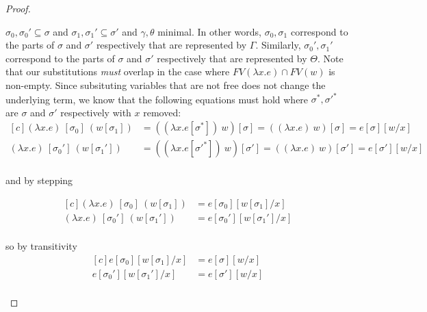 \begin{proof}
\begin{description}
      $\sigma_0, \sigma_0' \subseteq \sigma$ and 
      $\sigma_1, \sigma_1' \subseteq \sigma'$ and $\gamma, \theta$ minimal.
      In other words, $\sigma_0, \sigma_1$ correspond to the parts of $\sigma$ and $\sigma'$ 
      respectively that are represented by $\Gamma$.
      Similarly, $\sigma_0', \sigma_1'$ correspond to the parts of $\sigma$ and $\sigma'$ 
      respectively that are represented by $\Theta$.
      Note that our substitutions \textit{must} overlap in the case where $FV(\lambda x . e)
      \cap FV(w)$ is non-empty.
      Since subsituting variables that are not free does not change the
      underlying term, we know that the following equations must hold where
      $\sigma^*, \sigma'^*$ are $\sigma$ and $\sigma'$ respectively with $x$
      removed:
      \begin{equation}
        \begin{aligned}[c]
          (\lambda x . e)~[\sigma_0]~(w[\sigma_1]) &= 
            ((\lambda x . e[\sigma^*])~w)[\sigma] = 
            ((\lambda x . e)~w)[\sigma] = 
            e[\sigma][w/x] \\
          (\lambda x . e)~[\sigma_0']~(w[\sigma_1']) &= 
            ((\lambda x . e[\sigma'^*])~w)[\sigma'] = 
            ((\lambda x . e)~w)[\sigma'] = 
            e[\sigma'][w/x] \\
        \end{aligned}
      \end{equation}

      and by stepping

      \begin{equation}
        \begin{aligned}[c]
          (\lambda x . e)~[\sigma_0]~(w[\sigma_1]) &= e[\sigma_0][w[\sigma_1]/x] \\
          (\lambda x . e)~[\sigma_0']~(w[\sigma_1']) &= e[\sigma_0'][w[\sigma_1']/x] \\
        \end{aligned}
      \end{equation}

      so by transitivity
      \begin{equation}
        \begin{aligned}[c]
          e[\sigma_0][w[\sigma_1]/x] &=
            e[\sigma][w/x] \\
          e[\sigma_0'][w[\sigma_1']/x] &=
            e[\sigma'][w/x] \\
        \end{aligned}
      \end{equation}


\end{description}
\end{proof}
